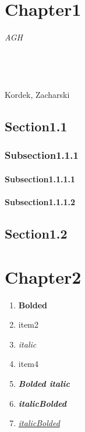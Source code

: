 \documentclass{report}
\begin{document}
    \chapter{Chapter1}
    \textit{AGH}
\\
\\
\\
\\
\\
Kordek, Zacharski

    \section{Section1.1}

    \subsection{Subsection1.1.1}

    \subsubsection{Subsection1.1.1.1}
    \subsubsection{Subsection1.1.1.2}

    \section{Section1.2}

    \chapter{Chapter2}

    \begin{enumerate}
        \item \textbf{Bolded}
        \item item2
        \item \textit{italic}
        \item item4
        \item \textbf{\textit{Bolded italic}}
        \item \textit{\textbf{italicBolded}}
        \item \textit{\underline{italicBolded}}
    \end{enumerate}
\end{document}

